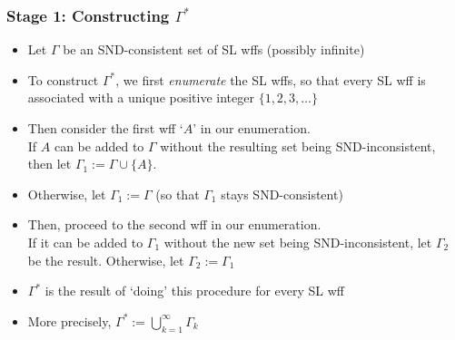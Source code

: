 \begin{frame}
\frametitle{Stage 1: Constructing $\Gamma^{\ast}$}

\begin{itemize}[<+->]

\item Let $\Gamma$ be an SND-consistent set of SL wffs (possibly infinite)

\item To construct $\Gamma^{\ast}$, we first \emph{enumerate} the SL wffs, so that every SL wff is associated with a unique positive integer $\{1, 2, 3, \dots \}$

\item Then consider the first wff `$A$' in our enumeration. \\ If $A$ can be added to $\Gamma$ without the resulting set being SND-inconsistent, then let  $\Gamma_1 := \Gamma \cup \{A\}$. 

\item Otherwise, let  $\Gamma_1 := \Gamma$ (so that $\Gamma_1$ stays SND-consistent)


\item Then, proceed to the second wff in our enumeration. \\ If it can be added to $\Gamma_1$ without the new set being SND-inconsistent, let $\Gamma_2$ be the result. Otherwise, let $\Gamma_2 := \Gamma_1$

\item $\Gamma^{\ast}$ is the result of `doing' this procedure for every SL wff

\item More precisely, $\Gamma^{\ast} := \bigcup_{k=1}^{\infty} \Gamma_k$


\end{itemize}
\end{frame}

